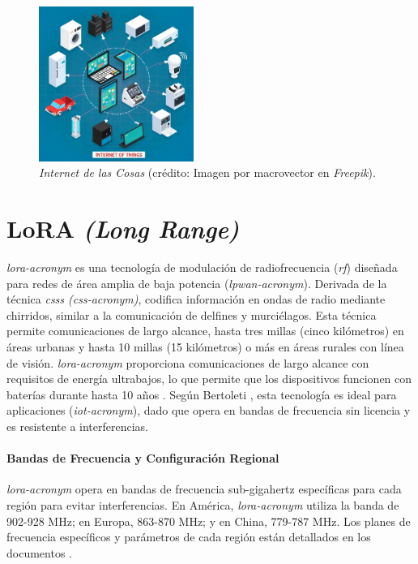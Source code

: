 \begin{figure}[H]
\leavevmode
\begin{minipage}{\textwidth}
\begin{center}
\includegraphics[width=0.45\textwidth]{./capitulo_02/figures/IoT_concept}
\caption{\textit{Internet de las Cosas} (crédito: Imagen por macrovector en \textit{Freepik}). \label{fig:IoTc}}
\end{center}
\end{minipage}
\end{figure}



\section{LoRA \textit{(Long Range)}}

\textit{\acrshort{lora-acronym}} es una tecnología de modulación de radiofrecuencia (\textit{\acrshort{rf}}) diseñada para redes de área amplia de baja potencia (\textit{\acrshort{lpwan-acronym}}). Derivada de la técnica \textit{\glspl{css} (\acrshort{css-acronym})}, codifica información en ondas de radio mediante chirridos, similar a la comunicación de delfines y murciélagos. Esta técnica permite comunicaciones de largo alcance, hasta tres millas (cinco kilómetros) en áreas urbanas y hasta 10 millas (15 kilómetros) o más en áreas rurales con línea de visión. \textit{\acrshort{lora-acronym}} proporciona comunicaciones de largo alcance con requisitos de energía ultrabajos, lo que permite que los dispositivos funcionen con baterías durante hasta 10 años \cite{Lora, doc_whatislorawan, doc_overviewsemtech}. Según Bertoleti \cite{bertoleti2019proyectos}, esta tecnología es ideal para aplicaciones (\textit{\acrshort{iot-acronym}}), dado que opera en bandas de frecuencia sin licencia y es resistente a interferencias.

\paragraph{Bandas de Frecuencia y Configuración Regional\\}
\textit{\acrshort{lora-acronym}} opera en bandas de frecuencia sub-gigahertz específicas para cada región para evitar interferencias. En América, \textit{\acrshort{lora-acronym}} utiliza la banda de 902-928 MHz; en Europa, 863-870 MHz; y en China, 779-787 MHz. Los planes de frecuencia específicos y parámetros de cada región están detallados en los documentos \cite{doc_frequencyplans, doc_regionalparameters}.

